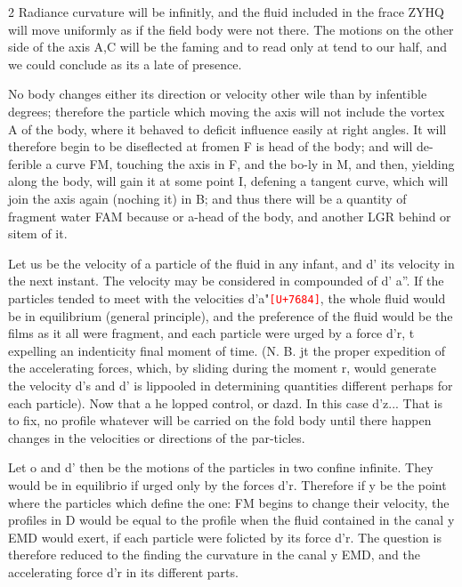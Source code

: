 \documentclass[10pt]{article}
\newcommand{\unk}[1]{\textcolor{red}{\texttt{\scriptsize[U+#1]}}}
\begin{document}
\begin{multicols}{2}\raggedcolumns
Radiance curvature will be infinitly, and the fluid included in the frace ZYHQ will move uniformly as if the field body were not there. The motions on the other side of the axis A,C will be the faming and to read only at tend to our half, and we could conclude as its a late of presence.

No body changes either its direction or velocity other wile than by infentible degrees; therefore the particle which moving the axis will not include the vortex A of the body, where it behaved to deficit influence easily at right angles. It will therefore begin to be diseflected at fromen F is head of the body; and will de-ferible a curve FM, touching the axis in F, and the bo-ly in M, and then, yielding along the body, will gain it at some point I, defening a tangent curve, which will join the axis again (noching it) in B; and thus there will be a quantity of fragment water FAM because or a-head of the body, and another LGR behind or sitem of it.

Let us be the velocity of a particle of the fluid in any infant, and d’ its velocity in the next instant. The velocity may be considered in compounded of d’ a”. If the particles tended to meet with the velocities d’a"\unk{7684}, the whole fluid would be in equilibrium (general principle), and the preference of the fluid would be the films as it all were fragment, and each particle were urged by a force d’r, t expelling an indenticity final moment of time. (N. B. jt the proper expedition of the accelerating forces, which, by sliding during the moment r, would generate the velocity d’s and d’ is lippooled in determining quantities different perhaps for each particle). Now that a he lopped control, or dazd. In this case d’z... That is to fix, no profile whatever will be carried on the fold body until there happen changes in the velocities or directions of the par-ticles.

Let o and d’ then be the motions of the particles in two confine infinite. They would be in equilibrio if urged only by the forces d’r. Therefore if y be the point where the particles which define the one: FM begins to change their velocity, the profiles in D would be equal to the profile when the fluid contained in the canal y EMD would exert, if each particle were folicted by its force d’r. The question is therefore reduced to the finding the curvature in the canal y EMD, and the accelerating force d’r in its different parts.


\end{multicols}
\end{document}
